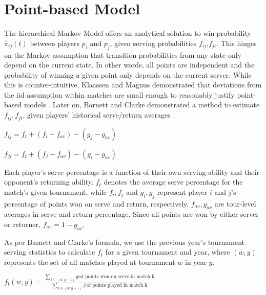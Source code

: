 \documentclass[chapterprefix=false]{report}
\begin{document}
\section{Point-based Model}
The hierarchical Markov Model offers an analytical solution to win probability $\hat{\pi}_{ij}(t)$ between players $p_i$ and $p_j$, given serving probabilities $f_{ij}$,$f_{ji}$. This hinges on the Markov assumption that transition probabilities from any state only depend on the current state. In other words, all points are independent and the probability of winning a given point only depends on the current server. While this is counter-intuitive, Klaassen and Magnus demonstrated that deviations from the iid assumption within matches are small enough to reasonably justify point-based models \cite{KlaassenandMagnus2001}. Later on, Barnett and Clarke demonstrated a method to estimate $f_{ij},f_{ji}$, given players' historical serve/return averages \cite{BarnettandClarke2005}.



\begin{center}
$f_{ij} = f_t + (f_i-f_{av})-(g_j-g_{av})$

$f_{ji} = f_t + (f_j-f_{av})-(g_i-g_{av})$
\end{center}

Each player's serve percentage is a function of their own serving ability and their opponent's returning ability. $f_t$ denotes the average serve percentage for the match's given tournament, while $f_i,f_j$ and $g_i,g_j$ represent player $i$ and $j$'s percentage of points won on serve and return, respectively. $f_{av},g_{av}$ are tour-level averages in serve and return percentage. Since all points are won by either server or returner, $f_{av} =1-g_{av}$.

As per Barnett and Clarke's formula, we use the previous year's tournament serving statistics to calculate $f_t$ for a given tournament and year, where $(w,y)$ represents the set of all matches played at tournament $w$ in year $y$.

\begin{center}
$f_t(w,y) = \frac{\sum_{k \in (w,y-1)}{\text{\# of points won on serve in match k}}}{\sum_{k \in (w,y-1)}\text{\# of points played in match k}}$
\end{center}
\end{document}
